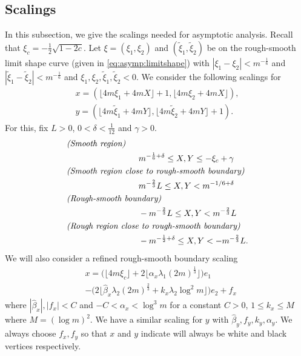 \documentclass[11pt,twoside]{amsart}
\theoremstyle{plain}
\numberwithin{quest}{section}
\theoremstyle{remark}
\numberwithin{rem}{section}
\theoremstyle{definition}
\begin{document}
	
	
	
	
	\subsection{Scalings}
	
	In this subsection, we give the scalings needed for asymptotic analysis. 
	Recall that  $\xi_c=-\frac{1}{2}\sqrt{1-2c}$.  Let $\xi = (\xi_1, \xi_2)$ and $(\tilde{\xi}_1, \tilde{\xi}_2)$ be on the rough-smooth limit shape curve (given in \eqref{eq:asymp:limitshape}) with $|\xi_1 -\xi_2|<m^{-\frac{1}{6}}$ and $|\tilde{\xi}_1 -\tilde{\xi}_2|<m^{-\frac{1}{6}}$ and $\xi_1,\xi_2,\tilde{\xi}_1,\tilde{\xi}_2<0$. We consider the following scalings for 
	\begin{equation}
		\begin{array}{l} \label{eq:def:scalingsxy}
			x=(\lfloor 4m\xi_1+4mX\rfloor+1,\lfloor 4m\xi_2+4mX \rfloor), \\
			y=(\lfloor 4m\tilde{\xi}_1+4mY \rfloor ,\lfloor 4m\tilde{\xi}_2+4mY \rfloor+1).
		\end{array}
	\end{equation}
	For this, fix $L>0$, $0<\delta <\frac{1}{12}$ and $\gamma >0$. 
	\begin{align}
		&\mbox{\emph{(Smooth region)}}  \nonumber\\
		&\hspace{30mm}m^{-\frac{1}{6}+\delta} \leq X,Y \leq -\xi_c + \gamma \label{eq:def:sm}\\
		&\mbox{\emph{(Smooth region close to rough-smooth boundary)}} \nonumber\\  
		&\hspace{30mm}m^{-\frac{2}{3}}L\leq X,Y < m^{-1/6+\delta}  \label{eq:def:smclosetoRS}\\
		&\mbox{\emph{(Rough-smooth boundary)}}  \nonumber \\
		&\hspace{30mm}-m^{-\frac{2}{3}}L\leq X,Y < m^{-\frac{2}{3}}L \label{eq:def:rs} \\
		&\mbox{\emph{(Rough region close to rough-smooth boundary)}}  \nonumber\\
		&\hspace{30mm}-m^{-\frac{1}{2}+\delta}\leq X,Y < -m^{-\frac{2}{3}}L \label{eq:def:rgclosetoRS}.
	\end{align}
	We will also consider a refined rough-smooth boundary scaling
	\begin{equation}
		\begin{split}
			\label{eq:def:rsrefined}
			&x=\big(\lfloor 4m\xi_c \rfloor +2 \lfloor \alpha_x \lambda_1 (2m)^{\frac{1}{3}}\rfloor)e_1\\
			&-\big(2\lfloor \hat{\beta}_x \lambda_2 (2m)^{\frac{2}{3}} +k_x \lambda_2 \log^2 m\rfloor \big)e_2 +f_x
		\end{split}
	\end{equation}
	where $|\hat{\beta}_x|,|f_x| <C$ and $-C<\alpha_x<\log^3 m$ for a constant $C>0$, $1\leq k_x \leq M$ where  $M=(\log m)^2 $. We have a similar scaling for $y$ with $\hat{\beta}_y,f_y, k_y, \alpha_y$.  We always choose $f_x, f_y$ so that $x$ and $y$ indicate will always be white and black vertices respectively. 
\end{document}
